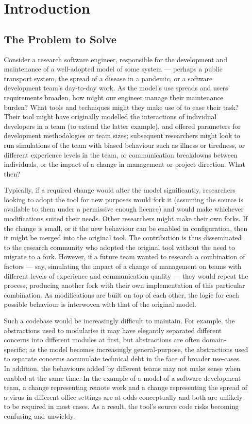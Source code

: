 \chapter{Introduction}

\section{The Problem to Solve}

Consider a research software engineer, responsible for the development and
maintenance of a well-adopted model of some \sociotechnical system --- perhaps a
public transport system, the spread of a disease in a pandemic, or a software
development team's day-to-day work. As the model's use spreads and users'
requirements broaden, how might our engineer manage their maintenance burden?
What tools and techniques might they make use of to ease their task? Their tool
might have originally modelled the interactions of individual developers in a
team (to extend the latter example), and offered parameters for development
methodologies or team sizes; subsequent researchers might look to run
simulations of the team with biased behaviour such as illness or tiredness, or
different experience levels in the team, or communication breakdowns between
individuals, or the impact of a change in management or project direction. What
then?

Typically, if a required change would alter the model significantly, researchers
looking to adopt the tool for new purposes would fork it (assuming the source is
available to them under a permissive enough licence) and would make whichever
modifications suited their needs. Other researchers might make their own forks.
If the change is small, or if the new behaviour can be enabled in configuration,
then it might be merged into the original tool. The contribution is thus
disseminated to the research community who adopted the original tool without the
need to migrate to a fork. However, if a future team wanted to research a
combination of factors --- say, simulating the impact of a change of management
on teams with different levels of experience and communication quality --- they
would repeat the process, producing another fork with their own implementation
of this particular combination. As modifications are built on top of each other,
the logic for each possible behaviour is interwoven with that of the original
model.

Such a codebase would be increasingly difficult to maintain. For example, the
abstractions used to modularise it may have elegantly separated different
concerns into different modules at first, but abstractions are often
domain-specific; as the model becomes increasingly general-purpose, the
abstractions used to separate concerns accumulate technical debt in the face of
broader use-cases. In addition, the behaviours added by different teams may not
make sense when enabled at the same time. In the example of a model of a
software development team, a change representing remote work and a change
representing the spread of a virus in different office settings are at odds
conceptually and both are unlikely to be required in most cases. As a result,
the tool's source code risks becoming confusing and unwieldy.

